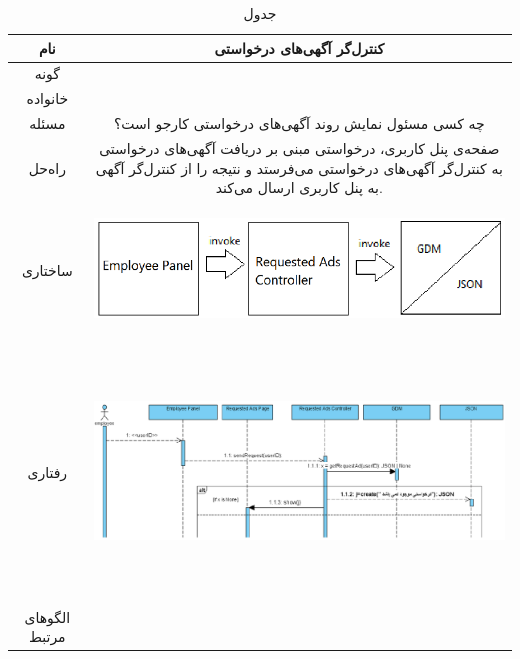 \begin{table}[H]
	\begin{adjustbox}{width=\textwidth}
		\begin{tabular}{|c|c|}
			\hline
			نام &
			کنترل‌گر آگهی‌های درخواستی \\ 
			\hline
			گونه & 
			\grasp \\
			\hline
			خانواده &
			\controller \\
			\hline
			مسئله & 
			چه کسی مسئول نمایش روند آگهی‌های درخواستی کارجو است؟\\
			\hline
			راه‌حل& 
			صفحه‌ی پنل ‌کاربری، درخواستی مبنی بر دریافت آگهی‌های درخواستی به کنترل‌گر آگهی‌های درخواستی می‌فرستد و نتیجه را از کنترل‌گر آگهی به پنل کاربری ارسال می‌کند. \\
			\hline
			ساختاری & 
			\begin{minipage}{\textwidth}
				\begin{flushleft}
					\begin{minipage}{\textwidth}
						\includegraphics[width=13cm, height=2.7cm]{./images/7-5-1}
					\end{minipage}
				\end{flushleft}
			\end{minipage}
			
			\\
			\hline
			رفتاری & 
			\begin{minipage}{\textwidth}
				\begin{flushleft}
					\begin{minipage}{\textwidth}
						\includegraphics[width=13.5cm, height=6cm]{./images/7-5-2}
					\end{minipage}
				\end{flushleft}
			\end{minipage}
			\\
			\hline
			الگو‌های مرتبط& \\
			\hline
		\end{tabular}
	\end{adjustbox}
	\caption{جدول }
	\label{table-with-pic:5}
\end{table}

